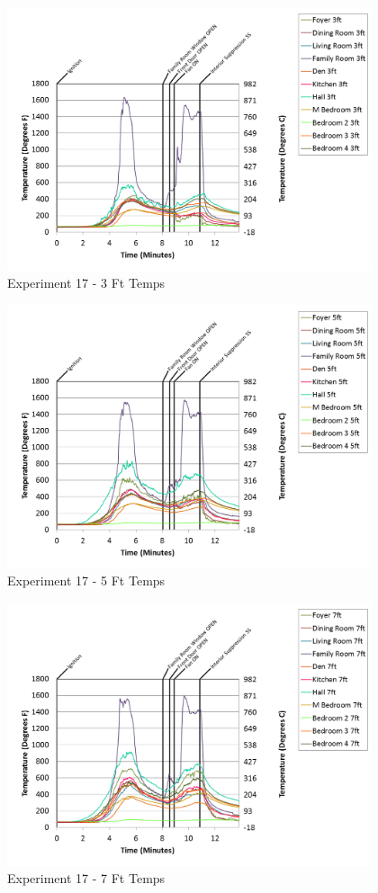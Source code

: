 \documentclass{article}
\begin{document}
\begin{appendices}
\begin{figure}[h!]
	\centering
	\includegraphics[height=3.05in]{0_Images/Results_Charts/Exp_17_Charts/3FtTemps.png}
	\caption{Experiment 17 - 3 Ft Temps}
\end{figure}

\clearpage

\begin{figure}[h!]
	\centering
	\includegraphics[height=3.05in]{0_Images/Results_Charts/Exp_17_Charts/5FtTemps.png}
	\caption{Experiment 17 - 5 Ft Temps}
\end{figure}


\begin{figure}[h!]
	\centering
	\includegraphics[height=3.05in]{0_Images/Results_Charts/Exp_17_Charts/7FtTemps.png}
	\caption{Experiment 17 - 7 Ft Temps}
\end{figure}


\end{appendices}
\end{document}
